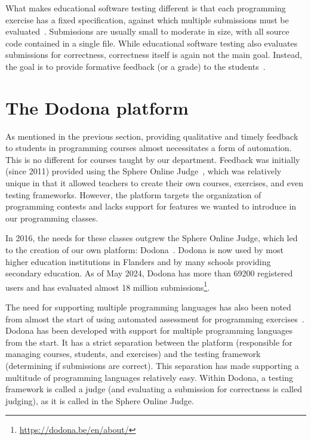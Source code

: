\documentclass[../main]{subfiles}
\begin{document}
What makes educational software testing different is that each programming exercise has a fixed specification, against which multiple submissions must be evaluated~\autocite{wilcoxTestingStrategiesAutomated2016}.
Submissions are usually small to moderate in size, with all source code contained in a single file.
While educational software testing also evaluates submissions for correctness, correctness itself is again not the main goal.
Instead, the goal is to provide formative feedback (or a grade) to the students~\autocite{caizaProgrammingAssignmentsAutomatic2013}.

\section{The Dodona platform}\label{sec:dodona}

As mentioned in the previous section, providing qualitative and timely feedback to students in programming courses almost necessitates a form of automation.
This is no different for courses taught by our department.
Feedback was initially (since 2011) provided using the Sphere Online Judge~\autocite{kosowskiApplicationOnlineJudge2008}, which was relatively unique in that it allowed teachers to create their own courses, exercises, and even testing frameworks.
However, the platform targets the organization of programming contests and lacks support for features we wanted to introduce in our programming classes.

In 2016, the needs for these classes outgrew the Sphere Online Judge, which led to the creation of our own platform: Dodona~\autocite{vanpetegemDodonaLearnCode2023}.
Dodona is now used by most higher education institutions in Flanders and by many schools providing secondary education.
As of May 2024, Dodona has more than \num{69200} registered users and has evaluated almost 18 million submissions\footnote{\url{https://dodona.be/en/about/}}.

The need for supporting multiple programming languages has also been noted from almost the start of using automated assessment for programming exercises~\autocite{hextAutomaticGradingScheme1969}.
Dodona has been developed with support for multiple programming languages from the start.
It has a strict separation between the platform (responsible for managing courses, students, and exercises) and the testing framework (determining if submissions are correct).
This separation has made supporting a multitude of programming languages relatively easy.
Within Dodona, a testing framework is called a judge (and evaluating a submission for correctness is called judging), as it is called in the Sphere Online Judge.
\end{document}
